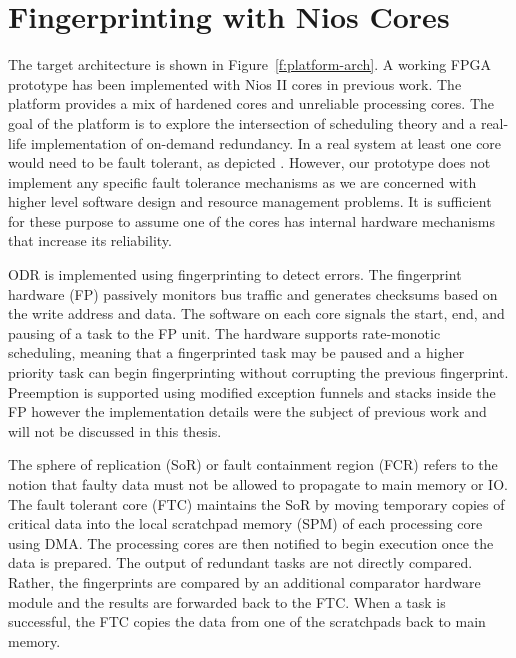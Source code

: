 \section{Fingerprinting with Nios Cores}

	The target architecture is shown in Figure~\ref{f:platform-arch}. 
	A working FPGA prototype has been implemented with Nios II cores in previous work. 
	The platform provides a mix of hardened cores and unreliable processing cores. 
	The goal of the platform is to explore the intersection of scheduling theory and a real-life implementation of on-demand redundancy. 
	In a real system at least one core would need to be fault tolerant, as depicted \cite{dobel2012watches}. 
	However, our prototype does not implement any specific fault tolerance mechanisms as we are concerned with higher level software design and resource management problems. 
	It is sufficient for these purpose to assume one of the cores has internal hardware mechanisms that increase its reliability.



	ODR is implemented using fingerprinting \cite{Smolens:04} to detect errors. 
	The fingerprint hardware (FP) passively monitors bus traffic and generates checksums based on the write address and data.
	The software on each core signals the start, end, and pausing of a task to the FP unit.
	The hardware supports rate-monotic scheduling, meaning that a fingerprinted task may be paused and a higher priority task can begin fingerprinting without corrupting the previous fingerprint.
	Preemption is supported using modified exception funnels and stacks inside the FP however the implementation details were the subject of previous work \cite{ugthesis} and will not be discussed in this thesis.
	
	The sphere of replication (SoR) or fault containment region (FCR) refers to the notion that faulty data must not be allowed to propagate to main memory or IO. 
	The fault tolerant core (FTC) maintains the SoR by moving temporary copies of critical data into the local scratchpad memory (SPM) of each processing core using DMA. 
	The processing cores are then notified to begin execution once the data is prepared. 
	The output of redundant tasks are not directly compared.
	Rather, the fingerprints are compared by an additional comparator hardware module and the results are forwarded back to the FTC. 
	When a task is successful, the FTC copies the data from one of the scratchpads back to main memory.
	
